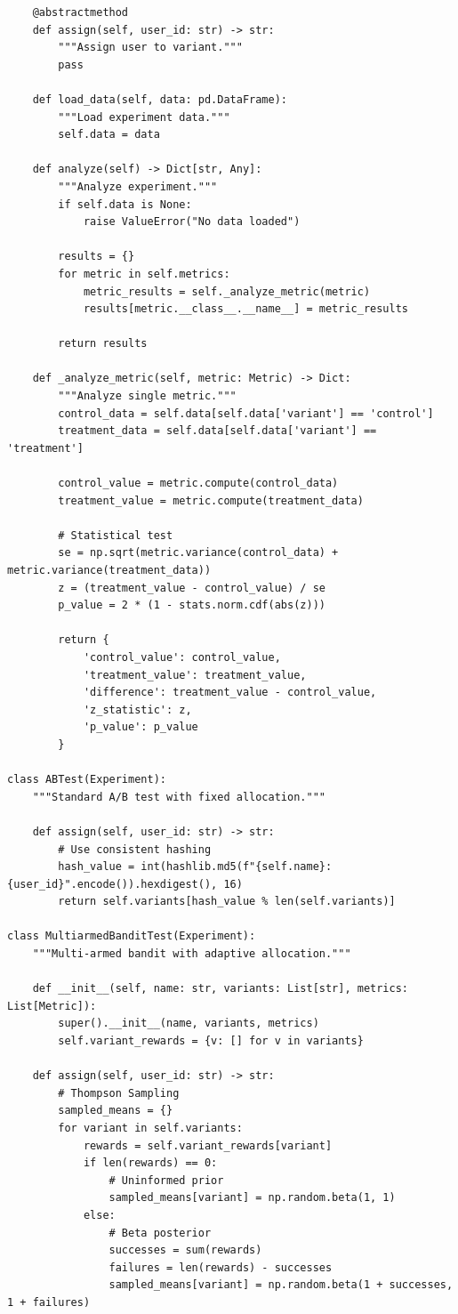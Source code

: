 \begin{lstlisting}
    @abstractmethod
    def assign(self, user_id: str) -> str:
        """Assign user to variant."""
        pass

    def load_data(self, data: pd.DataFrame):
        """Load experiment data."""
        self.data = data

    def analyze(self) -> Dict[str, Any]:
        """Analyze experiment."""
        if self.data is None:
            raise ValueError("No data loaded")

        results = {}
        for metric in self.metrics:
            metric_results = self._analyze_metric(metric)
            results[metric.__class__.__name__] = metric_results

        return results

    def _analyze_metric(self, metric: Metric) -> Dict:
        """Analyze single metric."""
        control_data = self.data[self.data['variant'] == 'control']
        treatment_data = self.data[self.data['variant'] == 'treatment']

        control_value = metric.compute(control_data)
        treatment_value = metric.compute(treatment_data)

        # Statistical test
        se = np.sqrt(metric.variance(control_data) + metric.variance(treatment_data))
        z = (treatment_value - control_value) / se
        p_value = 2 * (1 - stats.norm.cdf(abs(z)))

        return {
            'control_value': control_value,
            'treatment_value': treatment_value,
            'difference': treatment_value - control_value,
            'z_statistic': z,
            'p_value': p_value
        }

class ABTest(Experiment):
    """Standard A/B test with fixed allocation."""

    def assign(self, user_id: str) -> str:
        # Use consistent hashing
        hash_value = int(hashlib.md5(f"{self.name}:{user_id}".encode()).hexdigest(), 16)
        return self.variants[hash_value % len(self.variants)]

class MultiarmedBanditTest(Experiment):
    """Multi-armed bandit with adaptive allocation."""

    def __init__(self, name: str, variants: List[str], metrics: List[Metric]):
        super().__init__(name, variants, metrics)
        self.variant_rewards = {v: [] for v in variants}

    def assign(self, user_id: str) -> str:
        # Thompson Sampling
        sampled_means = {}
        for variant in self.variants:
            rewards = self.variant_rewards[variant]
            if len(rewards) == 0:
                # Uninformed prior
                sampled_means[variant] = np.random.beta(1, 1)
            else:
                # Beta posterior
                successes = sum(rewards)
                failures = len(rewards) - successes
                sampled_means[variant] = np.random.beta(1 + successes, 1 + failures)


\end{lstlisting}
